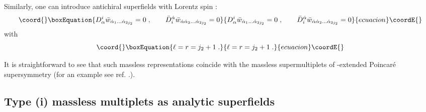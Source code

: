 \documentclass[a4paper,12pt]{article}
\begin{document}
Similarly, one can introduce antichiral superfields with Lorentz 
spin \coordHE{}: 
\begin{equation}\coord{}\boxEquation{\label{4.10}
  D^i_\alpha \bar w_{\dot\alpha_1\ldots\dot\alpha_{2j_2}}=0\;, 
\qquad \bar D_i^{\dot\alpha}\bar 
w_{\dot\alpha\dot\alpha_2\ldots\dot\alpha_{2j_2}}=0
}{D^i_\alpha \bar w_{\dot\alpha_1\ldots\dot\alpha_{2j_2}}=0\;, 
\qquad \bar D_i^{\dot\alpha}\bar 
w_{\dot\alpha\dot\alpha_2\ldots\dot\alpha_{2j_2}}=0
}{ecuacion}\coordE{}\end{equation}
with 
\begin{equation}\coord{}\boxEquation{\label{4.11}
  \ell = r = j_2+1\;.
}{\ell = r = j_2+1\;.
}{ecuacion}\coordE{}\end{equation} 

It is straightforward to see that such massless representations 
coincide with the massless supermultiplets of \coordHE{}-extended 
Poincar\'e supersymmetry (for an \coordHE{} example see ref. 
\cite{gm2}.). 

\subsection{Type (i) massless multiplets as analytic 
superfields}\label{imass} 
\end{document}
